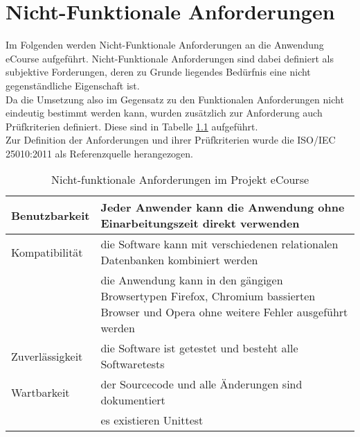\chapter{Nicht-Funktionale Anforderungen}
\label{sec:nicht_funktionale_Anforderungen}
Im Folgenden werden Nicht-Funktionale Anforderungen an die Anwendung eCourse aufgeführt. Nicht-Funktionale Anforderungen sind dabei definiert als subjektive Forderungen, deren zu Grunde liegendes Bedürfnis eine nicht gegenständliche Eigenschaft ist. \\
Da die Umsetzung also im Gegensatz zu den Funktionalen Anforderungen nicht eindeutig bestimmt werden kann, wurden zusätzlich zur Anforderung auch Prüfkriterien definiert. Diese sind in Tabelle \ref{tab:nicht-funktionale_Anforderungen} aufgeführt. \\
Zur Definition der Anforderungen und ihrer Prüfkriterien wurde die ISO/IEC 25010:2011 als Referenzquelle herangezogen.

\begin{table}
\centering
	\begin{tabularx}{\textwidth}[H]{|X|X|}
		\hline
		Benutzbarkeit & Jeder Anwender kann die Anwendung ohne Einarbeitungszeit direkt verwenden \\
		\hline 
		Kompatibilität & die Software kann mit verschiedenen relationalen Datenbanken kombiniert werden \\
		\hline 
		\quad & die Anwendung kann in den gängigen Browsertypen Firefox, Chromium bassierten Browser und Opera ohne weitere Fehler ausgeführt werden \\
		\hline
		Zuverlässigkeit & die Software ist getestet und besteht alle Softwaretests\\
		\hline
		Wartbarkeit & der Sourcecode und alle Änderungen sind dokumentiert \\
		\hline
		\quad & es existieren Unittest \\
		\hline
	\end{tabularx}
\caption{Nicht-funktionale Anforderungen im Projekt eCourse}
\label{tab:nicht-funktionale_Anforderungen}
\end{table}